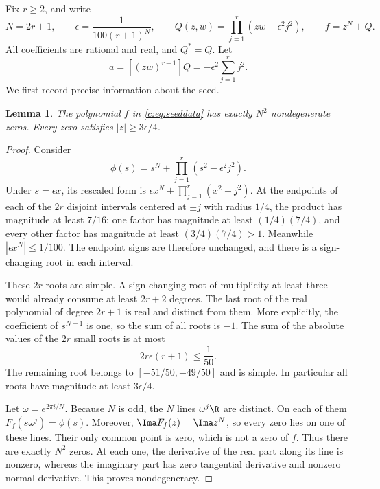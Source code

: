 \documentclass[UTF8,11pt]{ctexart}
\newtheorem{lem}[thm]{Lemma}
\theoremstyle{definition}
\numberwithin{equation}{section}
\begin{document}
Fix $r\ge2$, and write
\begin{equation}\label{c:eq:seeddata}
 N=2r+1,\qquad
 \epsilon=\frac1{100(r+1)^N},\qquad
 Q(z,w)=\prod_{j=1}^r(zw-\epsilon^2j^2),\qquad
 f=z^N+Q.
\end{equation}
All coefficients are rational and real, and $Q^*=Q$. Let
\begin{equation}\label{c:eq:coefficient}
 a=[(zw)^{r-1}]Q=-\epsilon^2\sum_{j=1}^rj^2.
\end{equation}
We first record precise information about the seed.
\begin{lem}\label{c:lem:seed}
The polynomial $f$ in \eqref{c:eq:seeddata} has exactly $N^2$
nondegenerate zeros. Every zero satisfies $|z|\ge3\epsilon/4$.
\end{lem}
\begin{proof}
Consider
\[
 \phi(s)=s^N+\prod_{j=1}^r(s^2-\epsilon^2j^2).
\]
Under $s=\epsilon x$, its rescaled form is
$\epsilon x^N+\prod_{j=1}^r(x^2-j^2)$. At the endpoints of each of the
$2r$ disjoint intervals centered at $\pm j$ with radius $1/4$, the
product has magnitude at least $7/16$: one factor has magnitude at
least $(1/4)(7/4)$, and every other factor has magnitude at least
$(3/4)(7/4)>1$. Meanwhile
$|\epsilon x^N|\le1/100$. The endpoint signs are therefore unchanged,
and there is a sign-changing root in each interval.

These $2r$ roots are simple. A sign-changing root of multiplicity at
least three would already consume at least $2r+2$ degrees. The last
root of the real polynomial of degree $2r+1$ is real and distinct from
them. More explicitly, the coefficient of $s^{N-1}$ is one, so the
sum of all roots is $-1$. The sum of the absolute values of the $2r$
small roots is at most
\[
 2r\epsilon(r+1)\le\frac1{50}.
\]
The remaining root belongs to $[-51/50,-49/50]$ and is simple. In
particular all roots have magnitude at least $3\epsilon/4$.

Let $\omega=e^{2\pi i/N}$. Because $N$ is odd, the $N$ lines
$\omega^j\R$ are distinct. On each of them $F_f(s\omega^j)=\phi(s)$.
Moreover, $\Ima F_f(z)=\Ima z^N$, so every zero lies on one of these
lines. Their only common point is zero, which is not a zero of $f$.
Thus there are exactly $N^2$ zeros. At each one, the derivative of the
real part along its line is nonzero, whereas the imaginary part has
zero tangential derivative and nonzero normal derivative. This proves
nondegeneracy.
\end{proof}
\end{document}
